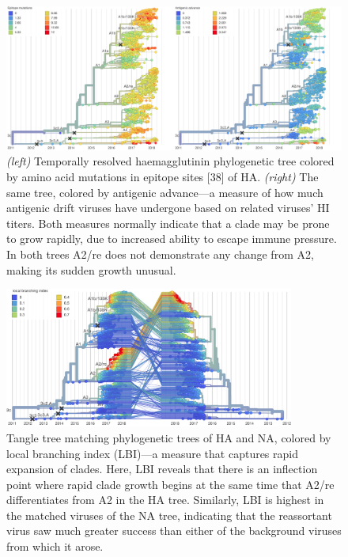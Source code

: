\documentclass[11pt,oneside,letterpaper]{article}
\begin{document}
% 
\begin{figure}[t!]
    \begin{center}
    \includegraphics[width=\textwidth]{../manuscript/in-progress/texfiles/figures/epi_aa_trees_high_res.png}
    \end{center}
    \caption{\textit{(left)} Temporally resolved haemagglutinin phylogenetic tree colored by amino acid mutations in epitope sites [38] of HA. \textit{(right)} The same tree, colored by antigenic advance---a measure of how much antigenic drift viruses have undergone based on related viruses' HI titers. Both measures normally indicate that a clade may be prone to grow rapidly, due to increased ability to escape immune pressure. In both trees A2/re does not demonstrate any change from A2, making its sudden growth unusual.}
    \label{sup_fig:epitope_aa}
\end{figure}

\begin{figure}[b]
    \begin{center}
    \includegraphics[width=0.85\textwidth]{../manuscript/in-progress/texfiles/figures/ha_na_lbi_high_res.png}
    \end{center}
    \caption{Tangle tree matching phylogenetic trees of HA and NA, colored by local branching index (LBI)---a measure that captures rapid expansion of clades. Here, LBI reveals that there is an inflection point where rapid clade growth begins at the same time that A2/re differentiates from A2 in the HA tree. Similarly, LBI is highest in the matched viruses of the NA tree, indicating that the reassortant virus saw much greater success than either of the background viruses from which it arose.}
    \label{sup_fig:lbi}
\end{figure}
\end{document}
